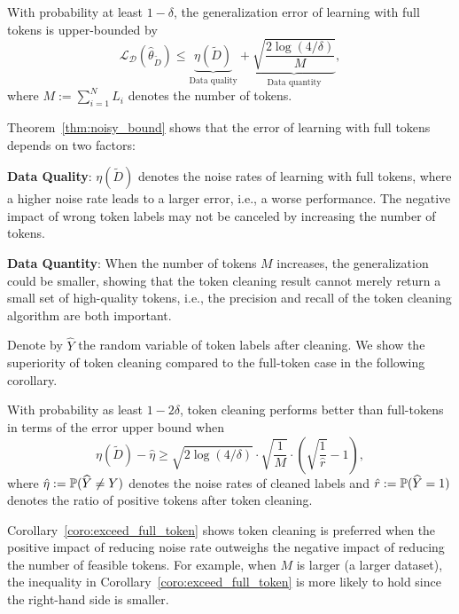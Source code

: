 \begin{theorem}\label{thm:noisy_bound}



With probability at least $1-\delta$, the generalization error of learning with full tokens is upper-bounded by
\begin{equation}\label{eq:error_ub}
    {\mathcal L}_{{\mathcal D}}(\hat \theta_{\widetilde D} ) 
\le \underbrace{\eta(\widetilde D)}_{\text{Data quality}} +
 \underbrace{ \sqrt{\frac{2\log({4}/\delta)}{M}}}_{\text{Data quantity}},
\end{equation}
where $M:=\sum_{i=1}^N L_i$ denotes the number of tokens.
\end{theorem}

Theorem~\ref{thm:noisy_bound} shows that the error of learning with full tokens depends on two factors:
\squishlist
\item \textbf{Data Quality}: $\eta(\widetilde D)$ denotes the noise rates of learning with full tokens, where a higher noise rate leads to a larger error, i.e., a worse performance. The negative impact of wrong token labels may not be canceled by increasing the number of tokens.
\item \textbf{Data Quantity}: When the number of tokens $M$ increases, the generalization could be smaller, showing that the token cleaning result cannot merely return a small set of high-quality tokens, i.e., the precision and recall of the token cleaning algorithm are both important. 
\squishend

Denote by $\widehat Y$ the random variable of token labels after cleaning.
We show the superiority of token cleaning compared to the full-token case in the following corollary.

\begin{corollary}\label{coro:exceed_full_token}
    With probability as least $1-2\delta$, token cleaning performs better than full-tokens in terms of the error upper bound when
\begin{equation}\label{eq:clean_vs_full}
    \eta(\widetilde D) - \hat\eta \ge \sqrt{2\log(4/\delta)} \cdot \sqrt{\frac{1}{M}} \cdot \left( \sqrt{\frac{1}{\hat r}} - 1 \right),
\end{equation}
where $\hat\eta:=\mathbb P(\widehat Y \ne Y)$ denotes the noise rates of cleaned labels and $\hat r:=\mathbb P(\widehat Y = 1)$ denotes the ratio of positive tokens after token cleaning.  
\end{corollary}
Corollary~\ref{coro:exceed_full_token} shows token cleaning is preferred when the positive impact of reducing noise rate outweighs the negative impact of reducing the number of feasible tokens. For example, when $M$ is larger (a larger dataset), the inequality in Corollary~\ref{coro:exceed_full_token} is more likely to hold since the right-hand side is smaller.





